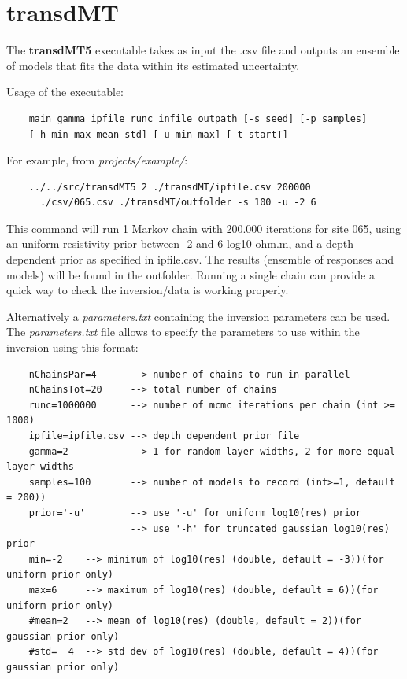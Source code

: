 \documentclass[]{scrartcl}
\begin{document}
	
	
	
    \section{transdMT} 	
    
    The \textbf{transdMT5} executable takes as input the .csv file and outputs an ensemble of models  that fits the data within its estimated uncertainty. 
    
     	Usage of the executable:
     	
    \begin{verbatim}
    main gamma ipfile runc infile outpath [-s seed] [-p samples] 
    [-h min max mean std] [-u min max] [-t startT]
    \end{verbatim} 

	For example, from \textit{projects/example/}:
	\begin{verbatim}
	../../src/transdMT5 2 ./transdMT/ipfile.csv 200000 
	  ./csv/065.csv ./transdMT/outfolder -s 100 -u -2 6
	\end{verbatim} 

    This command will run 1 Markov chain with 200.000 iterations for site 065, using an uniform resistivity prior between -2 and 6 log10 ohm.m, and a depth dependent prior as specified in ipfile.csv. The results (ensemble of responses and models) will be found in the outfolder. Running a single chain can provide a quick way to check the inversion/data is working properly. 
    
    Alternatively a \textit{parameters.txt} containing the inversion parameters can be used.    
	The \textit{parameters.txt} file allows to specify the parameters to use within the inversion using this format:
	
	\begin{verbatim}
	nChainsPar=4      --> number of chains to run in parallel
	nChainsTot=20     --> total number of chains 
	runc=1000000      --> number of mcmc iterations per chain (int >= 1000)
	ipfile=ipfile.csv --> depth dependent prior file 
	gamma=2           --> 1 for random layer widths, 2 for more equal layer widths
	samples=100       --> number of models to record (int>=1, default = 200))
	prior='-u'        --> use '-u' for uniform log10(res) prior
	                  --> use '-h' for truncated gaussian log10(res) prior
	min=-2    --> minimum of log10(res) (double, default = -3))(for uniform prior only)
	max=6     --> maximum of log10(res) (double, default = 6))(for uniform prior only)
	#mean=2   --> mean of log10(res) (double, default = 2))(for gaussian prior only)
	#std=  4  --> std dev of log10(res) (double, default = 4))(for gaussian prior only)
    \end{verbatim} 
    
\end{document}
